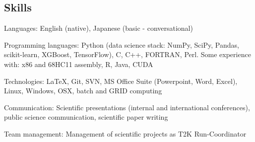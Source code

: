 \documentclass[margin,line]{resume}
\begin{document}
\begin{resume}

    \section{\mysidestyle Skills}
    \begin{list2}
        \item Languages: English (native), Japanese (basic - conversational)
        \item Programming languages: Python (data science stack: NumPy, SciPy, Pandas, scikit-learn, XGBoost, TensorFlow), C, C++, FORTRAN, Perl. Some experience with: x86 and 68HC11 assembly, R, Java, CUDA
        \item Technologies: LaTeX, Git, SVN, MS Office Suite (Powerpoint, Word, Excel), Linux, Windows, OSX, batch and GRID computing
        \item Communication: Scientific presentations (internal and international conferences), public science communication, scientific paper writing
        \item Team management: Management of scientific projects as T2K Run-Coordinator
    \end{list2}

\end{resume}
\end{document}
